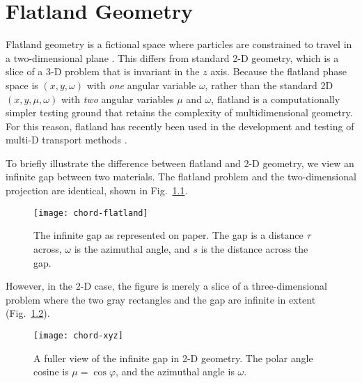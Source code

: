 
\chapter{Flatland Geometry}\label{chap:flatland}

Flatland geometry is a fictional space where particles are
constrained to travel in a two-dimensional plane \cite{Abb1884,Asa2008}. This
differs from standard 2-D
geometry, which is a slice of a 3-D problem that is invariant in the $z$ axis.
Because the flatland phase space is
$(x,y,\omega)$ with \emph{one} angular variable $\omega$, rather than the
standard 2D $(x,y,\mu,\omega)$ with \emph{two} angular variables $\mu$ and
$\omega$, flatland is a computationally simpler testing ground that retains the
complexity of multidimensional geometry. For this reason, flatland has recently
been used in the development and testing of multi-D transport methods
\cite{Lar2009c,Joh2011,Tra2011}.

To briefly illustrate the difference between flatland and 2-D geometry, we
view an infinite gap between two materials. The flatland problem and the
two-dimensional projection are identical, shown in Fig.~\ref{fig:chordFlatland}.
%
\begin{figure}[htb]
  \centering
  \texttt{[image: chord-flatland]}
  \caption[The infinite gap as represented on paper.]%
  {The infinite gap as represented on paper. The gap is a distance
  $\tau$ across, $\omega$ is the azimuthal angle, and $s$ is the
  distance across the gap.}
  \label{fig:chordFlatland}
\end{figure}
%
However, in the 2-D case, the figure is merely a slice of a three-dimensional
problem where the two gray rectangles and the gap are infinite in extent
(Fig.~\ref{fig:chordXy}).
%
\begin{figure}[htb]
  \centering
  \texttt{[image: chord-xyz]}
  \caption[A fuller view of the infinite gap in 2-D geometry.]%
  {A fuller view of the infinite gap in 2-D geometry.
  The polar angle cosine is $\mu= \cos \varphi$, and the azimuthal angle is
  $\omega$.}
  \label{fig:chordXy}
\end{figure}

%

